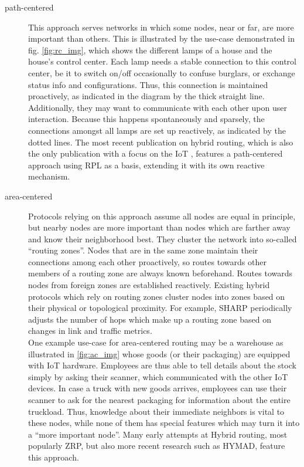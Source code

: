 \documentclass[a4paper,10pt]{scrartcl}
\begin{document}
\begin{description}
\item[path-centered] This approach serves networks in which some nodes, near or far, are more important than others. This is illustrated by the use-case demonstrated in fig. \ref{fig:rc_img}, which shows the different lamps of a house and the house's control center. Each lamp needs a stable connection to this control center, be it to switch on/off occasionally to confuse burglars, or exchange status info and configurations. Thus, this connection is maintained proactively, as indicated in the diagram by the thick straight line. Additionally, they may want to communicate with each other upon user interaction. Because this happens spontaneously and sparsely, the connections amongst all lamps are set up reactively, as indicated by the dotted lines.
The most recent publication on hybrid routing, which is also the only publication with a focus on the IoT \cite{RFC-6997}, features a path-centered approach using \gls{RPL}\cite{RFC-6550} as a basis, extending it with its own reactive mechanism.
\\
\item[area-centered] Protocols relying on this approach assume all nodes are equal in principle, but nearby nodes are more important than nodes which are farther away and know their neighborhood best. They cluster the network into so-called ``routing zones''. Nodes that are in the same zone maintain their connections among each other proactively, so routes towards other members of a routing zone are always known beforehand.
Routes towards nodes from foreign zones are established reactively. %
Existing hybrid protocols which rely on routing zones cluster nodes into zones based on their physical or topological proximity. For example, SHARP periodically adjusts the number of hops which make up a routing zone based on changes in link and traffic metrics.\\
One example use-case for area-centered routing may be a warehouse as illustrated in \ref{fig:ac_img} whose goods (or their packaging) are equipped with IoT hardware. Employees are thus able to tell details about the stock simply by asking their scanner, which communicated with the other IoT devices. In case a truck with new goods arrives, employees can use their scanner to ask for the nearest packaging for information about the entire truckload. Thus, knowledge about their immediate neighbors is vital to these nodes, while none of them has special features which may turn it into a ``more important node''. Many early attempts at Hybrid routing, most popularly \gls{ZRP}, but also more recent research such as HYMAD, feature this approach.
\end{description}
\end{document}
